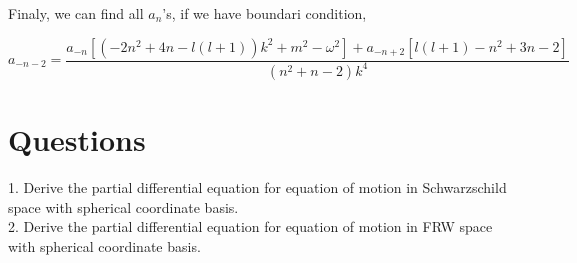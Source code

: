 Finaly, we can find all $a_n$'s, if we have boundari condition,

\begin{equation}
    a_{-n-2} =\frac{a_{-n}\left[(-2n^2+4n-l(l+1))k^2+m^2-\omega^2\right] + a_{-n+2}\left[l(l+1)-n^2+3n-2\right]}{(n^2+n-2)k^4}
\end{equation}

\section{Questions}

1. Derive the partial differential equation for equation of motion in Schwarzschild space with spherical coordinate basis.\\

2. Derive the partial differential equation for equation of motion in FRW space with spherical coordinate basis.\\

